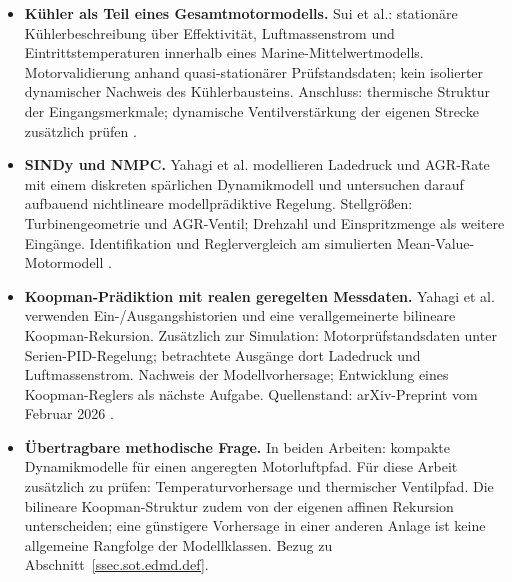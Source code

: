 \begin{itemize}
    Anschluss: Modellgröße, Optimierungsaufwand und Reglerstruktur
    zusammen bewerten; Fahrversuch als Umsetzungsbeleg mit diesen
    Grenzen und den Anlagenunterschieden zum Großmotor
    \cite[Abschn.~9.1 und 9.4, insbesondere S.~137--140]{vagapovModellierungIdentifikationUnd2024}.
  \item \textbf{Kühler als Teil eines Gesamtmotormodells.}
    Sui et al.: stationäre Kühlerbeschreibung über Effektivität,
    Luftmassenstrom und Eintrittstemperaturen innerhalb eines
    Marine-Mittelwertmodells.
    Motorvalidierung anhand quasi-stationärer Prüfstandsdaten;
    kein isolierter dynamischer Nachweis des Kühlerbausteins.
    Anschluss: thermische Struktur der Eingangsmerkmale;
    dynamische Ventilverstärkung der eigenen Strecke zusätzlich prüfen
    \cite[Abschn.~4.1; Anhang~B.2, Gl.~(B.6)--(B.10)]{suiMeanValueFirst2022}.
\end{itemize}

\begin{itemize}
  \item \textbf{SINDy und NMPC.}
    Yahagi et al. modellieren Ladedruck und AGR-Rate mit einem
    diskreten spärlichen Dynamikmodell und untersuchen darauf
    aufbauend nichtlineare modellprädiktive Regelung.
    Stellgrößen: Turbinengeometrie und AGR-Ventil;
    Drehzahl und Einspritzmenge als weitere Eingänge.
    Identifikation und Reglervergleich am simulierten
    Mean-Value-Motormodell
    \cite[Abschn.~3 und 5]{yahagiSparseIdentificationNonlinear2025}.
  \item \textbf{Koopman-Prädiktion mit realen geregelten Messdaten.}
    Yahagi et al. verwenden Ein-/Ausgangshistorien und eine
    verallgemeinerte bilineare Koopman-Rekursion.
    Zusätzlich zur Simulation: Motorprüfstandsdaten unter
    Serien-PID-Regelung; betrachtete Ausgänge dort Ladedruck und
    Luftmassenstrom. Nachweis der Modellvorhersage;
    Entwicklung eines Koopman-Reglers als nächste Aufgabe.
    Quellenstand: arXiv-Preprint vom Februar 2026
    \cite[Abschn.~III, V und VI]{yahagiGeneralizedBilinearKoopman2026}.
  \item \textbf{Übertragbare methodische Frage.}
    In beiden Arbeiten: kompakte Dynamikmodelle für einen angeregten
    Motorluftpfad. Für diese Arbeit zusätzlich zu prüfen:
    Temperaturvorhersage und thermischer Ventilpfad.
    Die bilineare Koopman-Struktur zudem von der eigenen affinen
    Rekursion unterscheiden; eine günstigere Vorhersage in einer
    anderen Anlage ist keine allgemeine Rangfolge der Modellklassen.
    Bezug zu Abschnitt~\ref{ssec.sot.edmd.def}.
\end{itemize}

